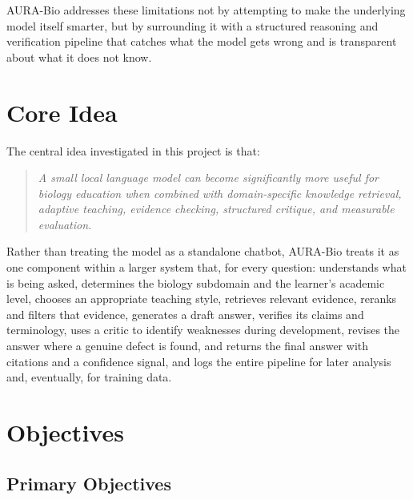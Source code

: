 AURA-Bio addresses these limitations not by attempting to make the
underlying model itself smarter, but by surrounding it with a structured
reasoning and verification pipeline that catches what the model gets wrong
and is transparent about what it does not know.

\section{Core Idea}\label{1.3}

The central idea investigated in this project is that:

\begin{quote}
\emph{A small local language model can become significantly more useful for
biology education when combined with domain-specific knowledge retrieval,
adaptive teaching, evidence checking, structured critique, and measurable
evaluation.}
\end{quote}

Rather than treating the model as a standalone chatbot, AURA-Bio treats it
as one component within a larger system that, for every question:
understands what is being asked, determines the biology subdomain and the
learner's academic level, chooses an appropriate teaching style, retrieves
relevant evidence, reranks and filters that evidence, generates a draft
answer, verifies its claims and terminology, uses a critic to identify
weaknesses during development, revises the answer where a genuine defect is
found, and returns the final answer with citations and a confidence signal, and
logs the entire pipeline for later analysis and, eventually, for training
data.

\section{Objectives}\label{1.4}

\subsection{Primary Objectives}\label{1.4.1}

